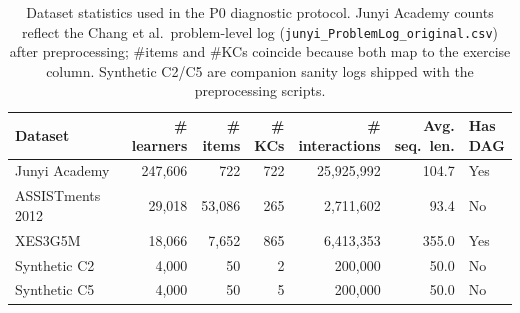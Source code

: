 \begin{table}[t]
\centering
\footnotesize
\setlength{\tabcolsep}{2pt}
\caption{Dataset statistics used in the P0 diagnostic protocol. Junyi Academy counts reflect the Chang et al.\ problem-level log (\texttt{junyi\_ProblemLog\_original.csv}) after preprocessing; \#items and \#KCs coincide because both map to the exercise column. Synthetic C2/C5 are companion sanity logs shipped with the preprocessing scripts.}
\label{tab:dataset-stats}
\begin{tabularx}{\columnwidth}{@{} >{\RaggedRight\arraybackslash}X rrrrr >{\centering\arraybackslash}p{14mm} @{}}
\toprule
Dataset & \makecell[r]{\#\\learners} & \makecell[r]{\#\\items} & \makecell[r]{\#\\KCs} & \makecell[r]{\#\\interactions} & \makecell[r]{Avg.\\seq.\ len.} & \makecell{Has\\DAG} \\
\midrule
Junyi Academy & 247,606 & 722 & 722 & 25,925,992 & 104.7 & Yes \\
ASSISTments 2012 & 29,018 & 53,086 & 265 & 2,711,602 & 93.4 & No \\
XES3G5M & 18,066 & 7,652 & 865 & 6,413,353 & 355.0 & Yes \\
Synthetic C2 & 4,000 & 50 & 2 & 200,000 & 50.0 & No \\
Synthetic C5 & 4,000 & 50 & 5 & 200,000 & 50.0 & No \\
\bottomrule
\end{tabularx}
\end{table}

